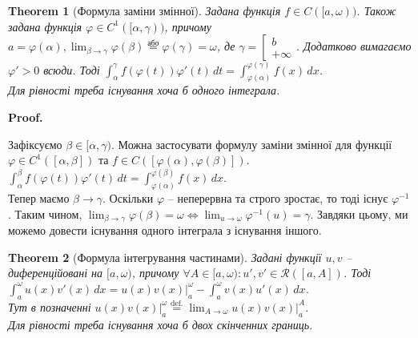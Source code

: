\documentclass[a4paper, 10pt]{article}
\makeatletter
\def\huge{\displaystyle}
\theoremstyle{theoremdd}
\newtheorem{theorem}{Theorem}[subsection]
\theoremstyle{theoremdd}
\theoremstyle{theoremdd}
\theoremstyle{theoremdd}
\theoremstyle{theoremdd}
\theoremstyle{theoremdd}
\theoremstyle{theoremdd}
\theoremstyle{theoremdd}
\theoremstyle{theoremdd}
\renewenvironment{proof}[1][Proof.\\]{\par
\pushQED{\hfill \qed}%
\normalfont \topsep6\p@\@plus6\p@\relax
\trivlist
\item\relax
{\bfseries
#1\@addpunct{.}}\hspace\labelsep\ignorespaces
}{%
\popQED\endtrivlist\@endpefalse
}
\makeatother
\begin{document}

\begin{theorem}[Формула заміни змінної]
Задана функція $f \in C([a,\omega))$. Також задана функція $\varphi \in C^1([\alpha,\gamma))$, причому $a = \varphi(\alpha), \huge\lim_{\beta \to \gamma} \varphi(\beta) \overset{\text{або}}{=} \varphi(\gamma) = \omega$, де $\gamma = \left[\begin{gathered} b \\ +\infty \end{gathered} \right.$. Додатково вимагаємо $\varphi' > 0$ всюди. Тоді $\huge\int_\alpha^\gamma f(\varphi(t))\varphi'(t)\,dt = \int_{\varphi(\alpha)}^{\varphi(\gamma)} f(x)\,dx$.\\
Для рівності треба існування хоча б одного інтеграла.
\end{theorem}

\begin{proof}
Зафіксуємо $\beta \in [\alpha,\gamma)$. Можна застосувати формулу заміни змінної для функції $\varphi \in C^1([\alpha,\beta])$ та $f \in C([\varphi(\alpha), \varphi(\beta)])$.\\
$\huge\int_\alpha^\beta f(\varphi(t))\varphi'(t)\,dt = \int_{\varphi(\alpha)}^{\varphi(\beta)} f(x)\,dx$.\\
Тепер маємо $\beta \to \gamma$. Оскільки $\varphi$ -- неперервна та строго зростає, то тоді існує $\varphi^{-1}$. Таким чином, $\displaystyle\lim_{\beta \to \gamma} \varphi(\beta) = \omega \iff \lim_{u \to \omega} \varphi^{-1}(u) = \gamma$. Завдяки цьому, ми можемо довести існування одного інтеграла з існування іншого.
\end{proof}

\begin{theorem}[Формула інтегрування частинами]
Задані функції $u,v$ -- диференційовані на $[a,\omega)$, причому $\forall A \in [a,\omega): u',v' \in \mathcal{R}([a,A])$. Тоді\\
$\displaystyle\int_a^\omega u(x)v'(x)\,dx = u(x)v(x) \Big|_a^{\omega} - \int_a^\omega v(x)u'(x)\,dx$.\\
Тут в позначенні $u(x)v(x) \Big|_a^\omega \overset{\text{def.}}{=} \displaystyle\lim_{A \to \omega} u(x)v(x) \Big|_{a}^A$.\\
Для рівності треба існування хоча б двох скінченних границь.
\end{theorem}
\end{document}
